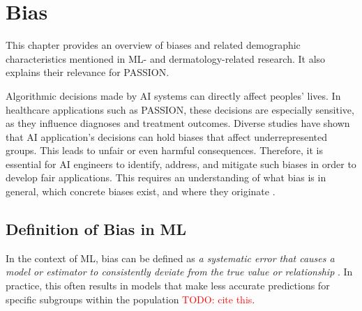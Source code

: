 \documentclass[12pt, a4paper, oneside]{book}   	%
\renewcommand{\todo}[1]{\textcolor{red}{TODO: #1}}
\newif\ifrawcitationactive
\newcommand{\rawcitationusedstart}{\color{violet}}
\newcommand{\rawcitationusedend}{%
	\ifrawcitationactive
	\color{purple}  %
	\else
	\color{black}  %
	\fi
}
\begin{document}
		
		\section{Bias}
			This chapter provides an overview of biases and related demographic characteristics mentioned in \gls{ML}- and dermatology-related research. It also explains their relevance for PASSION.
			
			Algorithmic decisions made by \gls{AI} systems can directly affect peoples' lives. In healthcare applications such as PASSION, these decisions are especially sensitive, as they influence diagnoses and treatment outcomes. Diverse studies have shown that \gls{AI} application's decisions can hold biases that affect underrepresented groups. This leads to unfair or even harmful consequences. Therefore, it is essential for \gls{AI} engineers to identify, address, and mitigate such biases in order to develop fair applications. This requires an understanding of what bias is in general, which concrete biases exist, and where they originate \autocite{Mehrabi_2021}.
			
			

		
			\subsection{Definition of Bias in \gls{ML}}
		    In the context of \gls{ML}, bias can be defined as \textit{a systematic error that causes a model or estimator to consistently deviate from the true value or relationship} \autocite{Delgado-Rodriguez_2004, Taylor_2023}. In practice, this often results in models that make less accurate predictions for specific subgroups within the population \todo{cite this}.
		    			    
\end{document}
